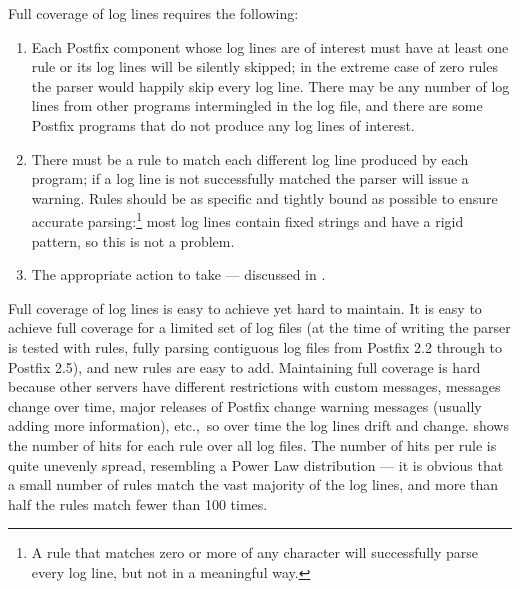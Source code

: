 Full coverage of log lines requires the following:

\begin{enumerate}

    \item Each Postfix component whose log lines are of interest must have
        at least one rule or its log lines will be silently skipped; in the
        extreme case of zero rules the parser would happily skip every log
        line.  There may be any number of log lines from other programs
        intermingled in the log file, and there are some Postfix programs
        that do not produce any log lines of interest.

    \item There must be a rule to match each different log line produced by
        each program; if a log line is not successfully matched the parser
        will issue a warning.  Rules should be as specific and tightly
        bound as possible to ensure accurate parsing:\footnote{A rule that
        matches zero or more of any character will successfully parse every
        log line, but not in a meaningful way.} most log lines contain
        fixed strings and have a rigid pattern, so this is not a problem.

    \item The appropriate action to take --- discussed in
        .

\end{enumerate}

Full coverage of log lines is easy to achieve yet hard to maintain.  It is
easy to achieve full coverage for a limited set of log files (at the time
of writing the parser is tested with \numberOFrules{} rules, fully parsing
\numberOFlogFILESall{} contiguous log files from Postfix 2.2 through to
Postfix 2.5), and new rules are easy to add.  Maintaining full coverage is
hard because other servers have different restrictions with custom
messages,  messages change over time, major releases of
Postfix change warning messages (usually adding more information), etc.,\
so over time the log lines drift and change.  
shows the number of hits for each rule over all \numberOFlogFILES{} log
files.  The number of hits per rule is quite unevenly spread, resembling a
Power Law distribution --- it is obvious that a small number of rules match
the vast majority of the log lines, and more than half the rules match
fewer than 100 times.


